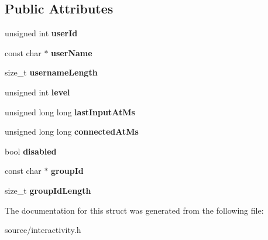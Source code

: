 \subsection*{Public Attributes}
\begin{DoxyCompactItemize}
\item 
\mbox{\label{structinteractive__participant_a9d27cfebd9602317dfaedadc9d302cd4}} 
unsigned int {\bfseries user\+Id}
\item 
\mbox{\label{structinteractive__participant_ae78a284af5fe3abc48b858d432957857}} 
const char $\ast$ {\bfseries user\+Name}
\item 
\mbox{\label{structinteractive__participant_ae31529a18da7df930653ce7be3a98472}} 
size\+\_\+t {\bfseries username\+Length}
\item 
\mbox{\label{structinteractive__participant_a9463ba0a9e848db399d5b1b7258231c7}} 
unsigned int {\bfseries level}
\item 
\mbox{\label{structinteractive__participant_a7017d514fa39298a9404e7af0542eaa0}} 
unsigned long long {\bfseries last\+Input\+At\+Ms}
\item 
\mbox{\label{structinteractive__participant_a1bbde35f772071a8887ccc6b66787194}} 
unsigned long long {\bfseries connected\+At\+Ms}
\item 
\mbox{\label{structinteractive__participant_aa1fa34e7b328bb17a0e89e6b9613be5a}} 
bool {\bfseries disabled}
\item 
\mbox{\label{structinteractive__participant_af3b3c838023579396e4a96ce5e962c60}} 
const char $\ast$ {\bfseries group\+Id}
\item 
\mbox{\label{structinteractive__participant_a76fae5d8de8d655451658d9711227d98}} 
size\+\_\+t {\bfseries group\+Id\+Length}
\end{DoxyCompactItemize}


The documentation for this struct was generated from the following file\+:\begin{DoxyCompactItemize}
\item 
source/interactivity.\+h\end{DoxyCompactItemize}

